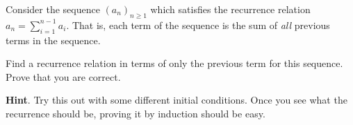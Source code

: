 \documentclass{book}
\begin{document}
\setcounter{cpjt}{142}
\addtocounter{cpjt}{-1}
\begin{activity}\label{activity-135}
\hypertarget{p-917}{}%
Consider the sequence \((a_n)_{n \ge 1}\) which satisfies the recurrence relation \(a_n = \sum_{i = 1}^{n-1} a_i\).  That is, each term of the sequence is the sum of \emph{all} previous terms in the sequence.%
\par
\hypertarget{p-918}{}%
Find a recurrence relation in terms of only the previous term for this sequence.  Prove that you are correct.%
\par\smallskip%
\noindent\textbf{Hint}.\hypertarget{hint-101}{}\quad%
\hypertarget{p-919}{}%
Try this out with some different initial conditions.  Once you see what the recurrence should be, proving it by induction should be easy.%
\end{activity}

\clearpage
\end{document}
